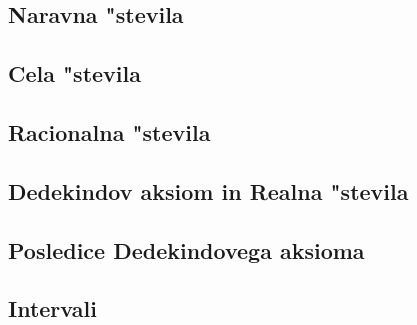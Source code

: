 \subsection{Naravna "stevila}


\subsection{Cela "stevila}


\subsection{Racionalna "stevila}


\subsection{Dedekindov aksiom in Realna "stevila}


\subsection{Posledice Dedekindovega aksioma}


\subsection{Intervali}

